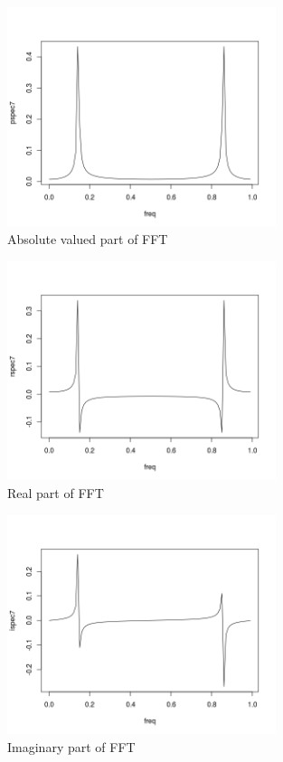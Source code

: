 \documentclass[paper=a4, fontsize=11pt]{scrartcl}
\numberwithin{equation}{section} %
\numberwithin{figure}{section} %
\numberwithin{table}{section} %
\begin{document}
\subsection{}
\begin{figure}[htp]
	\centering
	\includegraphics[width=0.7\textwidth, clip]{q1ba.png} 
	\caption{Absolute valued part of FFT}
\end{figure}

\begin{figure}[htp]
	\centering
	\includegraphics[width=0.7\textwidth, clip]{q1bb.png} 
	\caption{Real part of FFT}
\end{figure}
\pagebreak
\begin{figure}[htp]
	\centering
	\includegraphics[width=0.7\textwidth, clip]{q1bc.png} 
	\caption{Imaginary part of FFT}
\end{figure}
\end{document}
